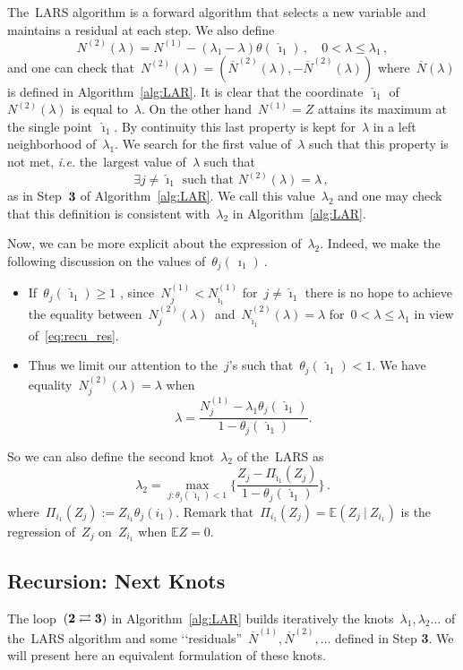 \documentclass[final,numbib]{imaiai}%
\numberwithin{equation}{section}
\def\eq{\begin{equation}}
\def\qe{\end{equation}}
\def\bbE{\mathds{E}}
\renewcommand{\bar}{\overline}
\renewcommand{\hat}{\widehat}
\newcommand{\<}{\langle}
\renewcommand{\>}{\rangle}
\newcommand{\1}{\mathds{1}}
\begin{document}
{The~LARS  algorithm is a forward algorithm that selects a new variable and maintains a residual at each step.  We also define
\eq
\label{eq:recu_res}
  N^{(2)}(\lambda)=N^{(1)} - (\lambda_1-\lambda) \theta(\,\hat \imath_1)\,,\quad 0<\lambda\leq\lambda_1\,,
\qe
and one can check that~$N^{(2)}(\lambda)=(\bar N^{(2)}(\lambda),-\bar N^{(2)}(\lambda))$ where~$\bar N(\lambda)$ is defined in Algorithm~\ref{alg:LAR}. It is clear that the coordinate~$\hat \imath_1$ of~$  N^{(2)}(\lambda)$  is equal to~$\lambda$. On the other hand~$  N^{(1)}=Z$ attains  its maximum  at the single point~$\hat \imath_1$. By continuity  this last property is kept   for~$\lambda$ in a left neighborhood of~$\lambda_1$. We search for the first value of~$\lambda$ such that this property is not met, {\it i.e.} the~largest value of~$\lambda$ such that 
$$
 \exists j \neq \hat \imath_1 \mbox{ such that }     N^{(2)}(\lambda)  = \lambda\,,
~$$
 as in Step~${\bf 3}$ of Algorithm~\ref{alg:LAR}. We call this value~$\lambda_2$ and one may check that this definition is consistent with~$\lambda_2$ in Algorithm~\ref{alg:LAR}. 
 
 Now, we can be more explicit about the expression of~$\lambda_2$. Indeed, we make the following discussion on the values of~$\theta_j(\,\hat \imath_1)~$.
 \begin{itemize}
 \item If~$\theta_j(\,\hat \imath_1)  \geq 1$ ,  since~$N^{(1)}_j  <N^{(1)}_{\hat \imath_1}$ for~$j\neq \hat \imath_1$ there is no hope to achieve the equality  between~$N^{(2)}_j(\lambda)~$ and~$N^{(2)}_{\hat \imath_1}(\lambda)=\lambda$ for~$0<\lambda\leq\lambda_1$ in view of~\eqref{eq:recu_res}.
 \item   Thus we limit our attention  to the~$j$'s such that~$\theta_j(\,\hat \imath_1) < 1$. We have equality~$N_j^{(2)}(\lambda)  = \lambda$  when
\[
 \lambda =   \frac{N^{(1)}_j -\lambda_1 \theta_j(\,\hat \imath_1)}{ 1-\theta_j(\,\hat \imath_1)}.
\]
 \end{itemize}
So we can also define the second  knot~$\lambda_2$ of the~LARS  as 
\[
 \lambda_2 %
  =\max_{j: \theta_j(\,\hat \imath_1) 
  < 1} 
  \bigg\{\frac{Z_j -\Pi_{\hat \imath_1}(Z_j)}{ 1-\theta_j(\,\hat \imath_1)}\bigg\}\,.
\]
where~$\Pi_{i_1}(Z_j):=Z_{i_1}\theta_j(i_1)$. Remark that~$\Pi_{i_1}(Z_j)=\bbE(Z_j\ |\ Z_{i_1})$ is the regression of~$Z_j$ on~$Z_{i_1}$ when $\bbE Z=0$. 


\subsection{Recursion: Next Knots}
\label{app:recursion}
The loop~$({\bf 2}\rightleftarrows{\bf 3})$ in Algorithm~\ref{alg:LAR} builds iteratively the knots~$\lambda_1,\lambda_2\ldots$ of the~LARS algorithm and some ‘‘residuals''~$\bar N^{(1)},\bar N^{(2)},\ldots$ defined in Step {\bf 3}. We will present here an equivalent formulation of these knots. 

}
\end{document}
